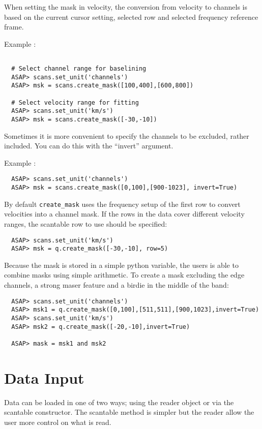 \documentclass[11pt]{article}
\newcommand{\cmd}[1]{{\tt #1}}
\begin{document}
When setting the mask in velocity, the conversion from velocity
to channels is based on the current cursor setting, selected row and
selected frequency reference frame.

Example :
\begin{verbatim}

  # Select channel range for baselining
  ASAP> scans.set_unit('channels')
  ASAP> msk = scans.create_mask([100,400],[600,800])

  # Select velocity range for fitting
  ASAP> scans.set_unit('km/s')
  ASAP> msk = scans.create_mask([-30,-10])
\end{verbatim}

Sometimes it is more convenient to specify the channels to be
excluded, rather included.  You can do this with the ``invert''
argument.

Example :
\begin{verbatim}
  ASAP> scans.set_unit('channels')
  ASAP> msk = scans.create_mask([0,100],[900-1023], invert=True)
\end{verbatim}

By default \cmd{create\_mask} uses the frequency setup of the first row
to convert velocities into a channel mask. If the rows in the data
cover different velocity ranges, the scantable row to use should be
specified:

\begin{verbatim}
  ASAP> scans.set_unit('km/s')
  ASAP> msk = q.create_mask([-30,-10], row=5)
\end{verbatim}

Because the mask is stored in a simple python variable, the users is
able to combine masks using simple arithmetic. To create a mask
excluding the edge channels, a strong maser feature and a birdie in
the middle of the band:

\begin{verbatim}
  ASAP> scans.set_unit('channels')
  ASAP> msk1 = q.create_mask([0,100],[511,511],[900,1023],invert=True)
  ASAP> scans.set_unit('km/s')
  ASAP> msk2 = q.create_mask([-20,-10],invert=True)

  ASAP> mask = msk1 and msk2
\end{verbatim}


\section{Data Input}

Data can be loaded in one of two ways; using the reader object or via
the scantable constructor. The scantable method is simpler but the
reader allow the user more control on what is read.
\end{document}
